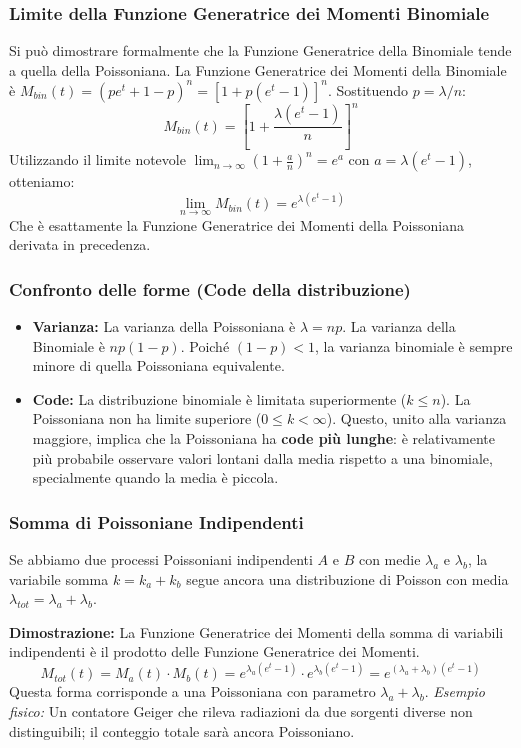 \documentclass[openany,a4paper,12pt]{book}
\theoremstyle{remark}
\begin{document}
\subsubsection{Limite della Funzione Generatrice dei Momenti Binomiale}
Si può dimostrare formalmente che la Funzione Generatrice della Binomiale tende a quella della Poissoniana.
La Funzione Generatrice dei Momenti della Binomiale è $M_{bin}(t) = (pe^t + 1 - p)^n = [1 + p(e^t - 1)]^n$.
Sostituendo $p = \lambda/n$:
\[
M_{bin}(t) = \left[ 1 + \frac{\lambda(e^t - 1)}{n} \right]^n
\]
Utilizzando il limite notevole $\lim_{n \to \infty} (1 + \frac{a}{n})^n = e^a$ con $a = \lambda(e^t - 1)$, otteniamo:
\[
\lim_{n \to \infty} M_{bin}(t) = e^{\lambda(e^t - 1)}
\]
Che è esattamente la Funzione Generatrice dei Momenti della Poissoniana derivata in precedenza.

\subsubsection{Confronto delle forme (Code della distribuzione)}
\begin{itemize}
    \item \textbf{Varianza:} La varianza della Poissoniana è $\lambda = np$. La varianza della Binomiale è $np(1-p)$.
    Poiché $(1-p) < 1$, la varianza binomiale è sempre minore di quella Poissoniana equivalente.
    \item \textbf{Code:} La distribuzione binomiale è limitata superiormente ($k \le n$). La Poissoniana non ha limite superiore ($0 \le k < \infty$). Questo, unito alla varianza maggiore, implica che la Poissoniana ha \textbf{code più lunghe}: è relativamente più probabile osservare valori lontani dalla media rispetto a una binomiale, specialmente quando la media è piccola.
\end{itemize}

\subsubsection{Somma di Poissoniane Indipendenti}
Se abbiamo due processi Poissoniani indipendenti $A$ e $B$ con medie $\lambda_a$ e $\lambda_b$, la variabile somma $k = k_a + k_b$ segue ancora una distribuzione di Poisson con media $\lambda_{tot} = \lambda_a + \lambda_b$.

\textbf{Dimostrazione:} La Funzione Generatrice dei Momenti della somma di variabili indipendenti è il prodotto delle Funzione Generatrice dei Momenti.
\[
M_{tot}(t) = M_a(t) \cdot M_b(t) = e^{\lambda_a(e^t - 1)} \cdot e^{\lambda_b(e^t - 1)} = e^{(\lambda_a + \lambda_b)(e^t - 1)}
\]
Questa forma corrisponde a una Poissoniana con parametro $\lambda_a + \lambda_b$.
\textit{Esempio fisico:} Un contatore Geiger che rileva radiazioni da due sorgenti diverse non distinguibili; il conteggio totale sarà ancora Poissoniano.
\end{document}
